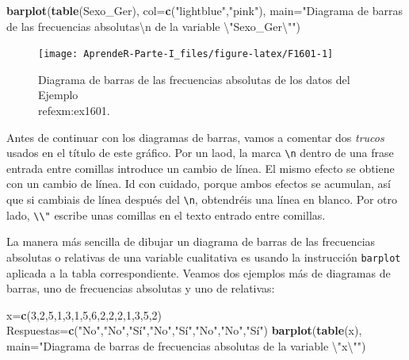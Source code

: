 \documentclass[]{book}
\newenvironment{Shaded}{\begin{snugshade}}{\end{snugshade}}
\newcommand{\CharTok}[1]{\textcolor[rgb]{0.31,0.60,0.02}{#1}}
\newcommand{\DataTypeTok}[1]{\textcolor[rgb]{0.13,0.29,0.53}{#1}}
\newcommand{\DecValTok}[1]{\textcolor[rgb]{0.00,0.00,0.81}{#1}}
\newcommand{\KeywordTok}[1]{\textcolor[rgb]{0.13,0.29,0.53}{\textbf{#1}}}
\newcommand{\NormalTok}[1]{#1}
\newcommand{\StringTok}[1]{\textcolor[rgb]{0.31,0.60,0.02}{#1}}
\theoremstyle{definition}
\theoremstyle{definition}
\theoremstyle{definition}
\theoremstyle{remark}
\begin{document}
\begin{Shaded}
\begin{Highlighting}[]
\KeywordTok{barplot}\NormalTok{(}\KeywordTok{table}\NormalTok{(Sexo_Ger), }\DataTypeTok{col=}\KeywordTok{c}\NormalTok{(}\StringTok{"lightblue"}\NormalTok{,}\StringTok{"pink"}\NormalTok{), }
        \DataTypeTok{main=}\StringTok{"Diagrama de barras de las frecuencias absolutas}\CharTok{\textbackslash{}n}\StringTok{ de la variable }\CharTok{\textbackslash{}"}\StringTok{Sexo_Ger}\CharTok{\textbackslash{}"}\StringTok{"}\NormalTok{)}
\end{Highlighting}
\end{Shaded}

\begin{figure}

{\centering \texttt{[image: AprendeR-Parte-I\_files/figure-latex/F1601-1]} 

}

\caption{Diagrama de barras de las frecuencias absolutas de los datos  del Ejemplo \\ref{exm:ex1601}.}\label{fig:F1601}
\end{figure}

Antes de continuar con los diagramas de barras, vamos a comentar dos \emph{trucos} usados en el título de este gráfico. Por un laod, la marca \texttt{\textbackslash{}n} dentro de una frase entrada entre comillas introduce un cambio de línea. El mismo efecto se obtiene con un cambio de línea. Id con cuidado, porque ambos efectos se acumulan, así que si cambiais de línea después del \texttt{\textbackslash{}n}, obtendréis una línea en blanco. Por otro lado, \texttt{\textbackslash{}\textbackslash{}"} escribe unas comillas en el texto entrado entre comillas.

La manera más sencilla de dibujar un diagrama de barras de las frecuencias absolutas o relativas de una variable cualitativa es usando la instrucción \texttt{barplot} aplicada a la tabla correspondiente. Veamos dos ejemplos más de diagramas de barras, uno de frecuencias absolutas y uno de relativas:

\begin{Shaded}
\begin{Highlighting}[]
\NormalTok{x=}\KeywordTok{c}\NormalTok{(}\DecValTok{3}\NormalTok{,}\DecValTok{2}\NormalTok{,}\DecValTok{5}\NormalTok{,}\DecValTok{1}\NormalTok{,}\DecValTok{3}\NormalTok{,}\DecValTok{1}\NormalTok{,}\DecValTok{5}\NormalTok{,}\DecValTok{6}\NormalTok{,}\DecValTok{2}\NormalTok{,}\DecValTok{2}\NormalTok{,}\DecValTok{2}\NormalTok{,}\DecValTok{1}\NormalTok{,}\DecValTok{3}\NormalTok{,}\DecValTok{5}\NormalTok{,}\DecValTok{2}\NormalTok{)}
\NormalTok{Respuestas=}\KeywordTok{c}\NormalTok{(}\StringTok{"No"}\NormalTok{,}\StringTok{"No"}\NormalTok{,}\StringTok{"Sí"}\NormalTok{,}\StringTok{"No"}\NormalTok{,}\StringTok{"Sí"}\NormalTok{,}\StringTok{"No"}\NormalTok{,}\StringTok{"No"}\NormalTok{,}\StringTok{"Sí"}\NormalTok{)}
\KeywordTok{barplot}\NormalTok{(}\KeywordTok{table}\NormalTok{(x), }\DataTypeTok{main=}\StringTok{"Diagrama de barras de frecuencias absolutas de la variable }\CharTok{\textbackslash{}"}\StringTok{x}\CharTok{\textbackslash{}"}\StringTok{"}\NormalTok{)}
\end{Highlighting}
\end{Shaded}
\end{document}
